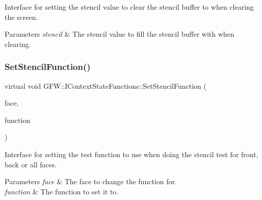 Interface for setting the stencil value to clear the stencil buffer to when clearing the screen. 


\begin{DoxyParams}{Parameters}
{\em stencil} & The stencil value to fill the stencil buffer with when clearing. \\
\hline
\end{DoxyParams}
\mbox{\label{class_g_f_w_1_1_i_context_state_functions_a629dbcbe63de3f751c4e39c09644667a}} 
\subsubsection{\texorpdfstring{Set\+Stencil\+Function()}{SetStencilFunction()}}
{\footnotesize\ttfamily virtual void G\+F\+W\+::\+I\+Context\+State\+Functions\+::\+Set\+Stencil\+Function (\begin{DoxyParamCaption}\item[{\hyperlink{namespace_g_f_w_a393ef12f1927ff3e7b73b11f72d551eb}{Face\+Direction}}]{face,  }\item[{\hyperlink{namespace_g_f_w_a2eabb5a646179bceaab2d5e3bfce2316}{Test\+Function}}]{function }\end{DoxyParamCaption})\hspace{0.3cm}{\ttfamily [pure virtual]}}



Interface for setting the test function to use when doing the stencil test for front, back or all faces. 


\begin{DoxyParams}{Parameters}
{\em face} & The face to change the function for. \\
\hline
{\em function} & The function to set it to. \\
\hline
\end{DoxyParams}
\mbox{\label{class_g_f_w_1_1_i_context_state_functions_af61e3907f133047c853204603478064b}} 

